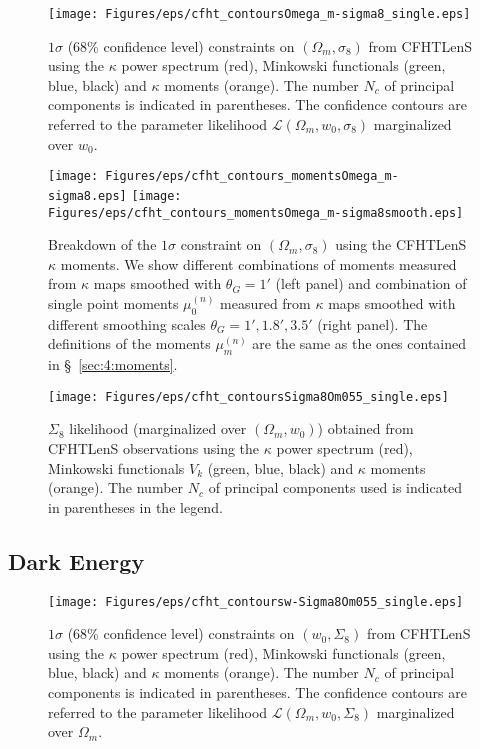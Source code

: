 \begin{figure}
\begin{center}
\texttt{[image: Figures/eps/cfht\_contoursOmega\_m-sigma8\_single.eps]}
\end{center}
\caption{$1\sigma$ (68\% confidence level) constraints on $(\Omega_m,\sigma_8)$ from CFHTLenS using the $\kappa$ power spectrum (red), Minkowski functionals (green, blue, black) and $\kappa$ moments (orange). The number $N_c$ of principal components is indicated in parentheses. The confidence contours are referred to the parameter likelihood $\mathcal{L}(\Omega_m,w_0,\sigma_8)$ marginalized over $w_0$.}
\label{fig:6:cOmSisingle}
\end{figure}
%
\begin{figure}
\begin{center}
\texttt{[image: Figures/eps/cfht\_contours\_momentsOmega\_m-sigma8.eps]} \texttt{[image: Figures/eps/cfht\_contours\_momentsOmega\_m-sigma8smooth.eps]}
\end{center}
\caption{Breakdown of the $1\sigma$ constraint on $(\Omega_m,\sigma_8)$ using the CFHTLenS $\kappa$ moments. We show different combinations of moments measured from $\kappa$ maps smoothed with $\theta_G=1'$ (left panel) and combination of single point moments $\mu_0^{(n)}$ measured from $\kappa$ maps smoothed with different smoothing scales $\theta_G=1',1.8',3.5'$ (right panel). The definitions of the moments $\mu_m^{(n)}$ are the same as the ones contained in \S~\ref{sec:4:moments}.}
\label{fig:6:cOmSimoments}
\end{figure}
%
\begin{figure}
\begin{center}
\texttt{[image: Figures/eps/cfht\_contoursSigma8Om055\_single.eps]}
\end{center}
\caption{$\Sigma_8$ likelihood (marginalized over $(\Omega_m,w_0)$) obtained from CFHTLenS observations using the $\kappa$ power spectrum (red), Minkowski functionals $V_k$ (green, blue, black) and $\kappa$ moments (orange). The number $N_c$ of principal components used is indicated in parentheses in the legend.}
\label{fig:6:cSi855}
\end{figure}

\subsection{Dark Energy}

\begin{figure}
\begin{center}
\texttt{[image: Figures/eps/cfht\_contoursw-Sigma8Om055\_single.eps]}
\end{center}
\caption{$1\sigma$ (68\% confidence level) constraints on $(w_0,\Sigma_8)$ from CFHTLenS using the $\kappa$ power spectrum (red), Minkowski functionals (green, blue, black) and $\kappa$ moments (orange). The number $N_c$ of principal components is indicated in parentheses. The confidence contours are referred to the parameter likelihood $\mathcal{L}(\Omega_m,w_0,\Sigma_8)$ marginalized over $\Omega_m$.}
\label{fig:6:cwSi855signle}
\end{figure}


